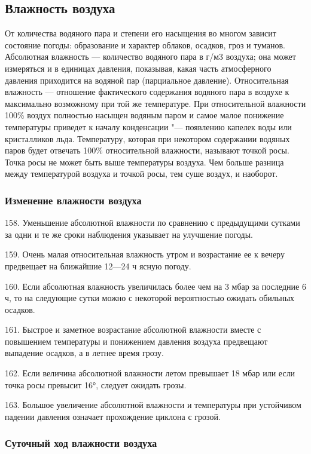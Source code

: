 \subsection{Влажность воздуха}

От количества водяного пара и степени его насыщения во многом зависит состояние погоды: образование и характер облаков, осадков, гроз и туманов. Абсолютная влажность — количество водяного пара в г/м3 воздуха; она может измеряться и в единицах давления, показывая, какая часть атмосферного давления приходится на водяной пар (парциальное давление). Относительная влажность — отношение фактического содержания водяного пара в воздухе к максимально возможному при той же температуре. При относительной влажности 100\% воздух полностью насыщен водяным паром и самое малое понижение температуры приведет к началу конденсации "--- появлению капелек воды или кристалликов льда. Температуру, которая при некотором содержании водяных паров будет отвечать 100\% относительной влажности, называют точкой росы. Точка росы не может быть выше температуры воздуха. Чем больше разница между температурой воздуха и точкой росы, тем суше воздух, и наоборот.

\subsubsection{Изменение влажности воздуха}

158. Уменьшение абсолютной влажности по сравнению с предыдущими сутками за одни и те же сроки наблюдения указывает на улучшение погоды.

159. Очень малая относительная влажность утром и возрастание ее к вечеру предвещает на ближайшие 12—24 ч ясную погоду.

160. Если абсолютная влажность увеличилась более чем на 3 мбар за последние 6 ч, то на следующие сутки можно с некоторой вероятностью ожидать обильных осадков.

161. Быстрое и заметное возрастание абсолютной влажности вместе с повышением температуры и понижением давления воздуха предвещают выпадение осадков, а в летнее время грозу.

162. Если величина абсолютной влажности летом превышает 18 мбар или если точка росы превысит 16°, следует ожидать грозы.

163. Большое увеличение абсолютной влажности и температуры при устойчивом падении давления означает прохождение циклона с грозой.

\subsubsection{Суточный ход влажности воздуха}

